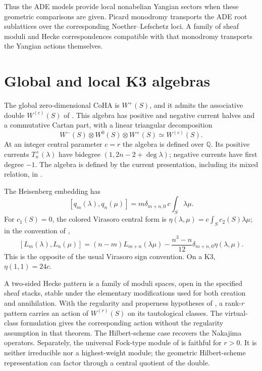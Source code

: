 Thus the ADE models provide local nonabelian Yangian sectors when
these geometric comparisons are given. Picard monodromy transports the ADE root sublattices over the corresponding Noether--Lefschetz loci. A family of sheaf moduli and Hecke correspondences compatible with that monodromy transports the Yangian actions themselves.

\section{Global and local K3 algebras}
The global zero-dimensional CoHA is $W^+(S)$, and it admits the
associative double $W^{(c)}(S)$ of \cite{MMSVSurface}. This algebra has
positive and negative current halves and a commutative Cartan part,
with a linear triangular decomposition
\[
 W^-(S)\otimes W^0(S)\otimes W^+(S)\simeq W^{(c)}(S).
\]
At an integer central parameter $c=r$ the algebra is defined over
$\mathbb Q$. Its positive currents $T_n^+(\lambda)$ have bidegree
$(1,2n-2+\deg\lambda)$; negative currents have first degree $-1$.
The algebra is defined by the current presentation, including its mixed relation, in \cite[Definition~3.10]{MMSVSurface}.

The Heisenberg embedding has
\[
 [q_m(\lambda),q_n(\mu)]
 =m\delta_{m+n,0}\,c\!\int_S\lambda\mu.
\]
For $c_1(S)=0$, the colored Virasoro central form is
$\eta(\lambda,\mu)=c\int_Sc_2(S)\lambda\mu$; in the convention
of \cite[Proposition~3.20]{MMSVSurface},
\[
 [L_m(\lambda),L_n(\mu)]
 =(n-m)L_{m+n}(\lambda\mu)
  -\frac{n^3-n}{12}\delta_{m+n,0}\eta(\lambda,\mu).
\]
This is the opposite of the usual Virasoro sign convention. On a K3,
$\eta(1,1)=24c$.

A two-sided Hecke pattern is a family of moduli spaces, open in the
specified sheaf stacks, stable under the elementary modifications used
for both creation and annihilation. With the regularity and properness
hypotheses of \cite[Proposition~6.8]{MMSVSurface}, a rank-$r$ pattern
carries an action of $W^{(r)}(S)$ on its tautological classes.
The virtual-class formulation gives the corresponding action without
the regularity assumption in that theorem. The Hilbert-scheme case
recovers the Nakajima operators. Separately, the universal
Fock-type module of \cite[Proposition~4.8]{MMSVSurface} is faithful
for $r>0$. It is neither irreducible nor a highest-weight module;
the geometric Hilbert-scheme representation can factor through a
central quotient of the double.

